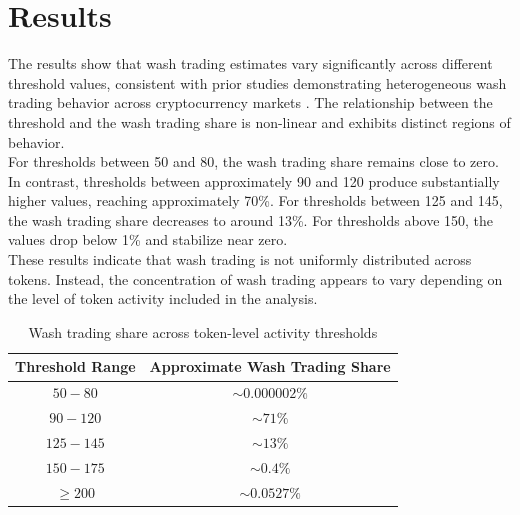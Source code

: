 \documentclass[language=english,thesis=bachelor,nosecondtitle,faculty=cb,onesided,13pt]{hsmw-thesis}
\begin{document}
	\section{Results}
The results show that wash trading estimates vary significantly across different threshold values, consistent with prior studies demonstrating heterogeneous wash trading behavior across cryptocurrency markets \cite{victor2021detecting, cui2023chain}. The relationship between the threshold and the wash trading share is non-linear and exhibits distinct regions of behavior.\\
For thresholds between 50 and 80, the wash trading share remains close to zero. In contrast, thresholds between approximately 90 and 120 produce substantially higher values, reaching approximately 70\%. For thresholds between 125 and 145, the wash trading share decreases to around 13\%. For thresholds above 150, the values drop below 1\% and stabilize near zero.\\
These results indicate that wash trading is not uniformly distributed across tokens. Instead, the concentration of wash trading appears to vary depending on the level of token activity included in the analysis.
\begin{table}[h!]
\centering
\begin{tabular}{cc}
	\hline
	\textbf{Threshold Range} & \textbf{Approximate Wash Trading Share} \\ \hline
	$50-80$    & $\sim 0.000002\%$ \\ 
	$90-120$   & $\sim 71\%$       \\ 
	$125-145$  & $\sim 13\%$       \\ 
	$150-175$  & $\sim 0.4\%$      \\ 
	$\geq  200$      & $\sim 0.0527\%$   \\ \hline
\end{tabular}
\caption{Wash trading share across token-level activity thresholds}
\label{table:wash_trading_shares}
\end{table}
\end{document}
